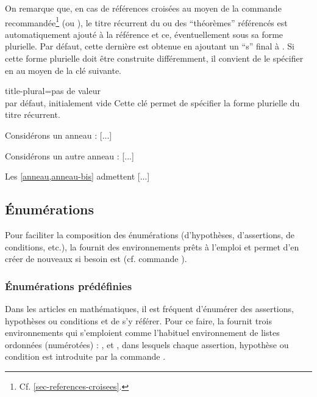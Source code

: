\documentclass[french,nolocaltoc]{nwejmart}
\newtheorem[style=definition]{fait}
\newtheorem[title=contraventionnalisation]{ctrv}
\newtheorem[title-plural=anneaux]{anneau}
\newtheorem[title-plural=idéaux]{idéal}
\begin{document}
  On remarque que, en cas de références croisées au moyen de la commande
  recommandée\footnote{Cf. \vref{sec-references-croisees}.}  (ou
  ), le titre récurrent du ou des \enquote{théorèmes} référencés
  est automatiquement ajouté à la référence et ce, éventuellement sous sa forme
  plurielle. Par défaut, cette dernière est obtenue en ajoutant un \enquote{s}
  final à . Si cette forme plurielle doit être construite
  différemment, il convient de le spécifier en  au moyen de la
  clé  suivante.
  \begin{docKey}{title-plural}{=}{pas de valeur\\par défaut, initialement vide}
      Cette clé permet de spécifier la forme plurielle du titre récurrent.
  \end{docKey}
\begin{bodycode}[listing and text,listing options={deletekeywords={[2]label}}]
\begin{anneau}\label{anneau}
  Considérons un anneau : [...]
\end{anneau}
\begin{anneau}\label{anneau-bis}
  Considérons un autre anneau : [...]
\end{anneau}
Les \vref{anneau,anneau-bis} admettent [...]
\end{bodycode}

\subsection{Énumérations}
\label{sec:list-dhyp-ou}

Pour faciliter la composition des énumérations (d'hypothèses, d'assertions, de
conditions, etc.), la \nwejmauthorcl{} fournit des environnements prêts
à l'emploi et permet d'en créer de nouveaux si besoin est (cf. commande
).

\subsubsection{Énumérations prédéfinies}
\label{sec:predefinies-:-listes}

Dans les articles en mathématiques, il est fréquent d'énumérer des assertions,
hypothèses ou conditions et de s'y référer. Pour ce faire, la \nwejmauthorcl{}
fournit trois environnements qui s'emploient comme l'habituel environnement
 de listes ordonnées (numérotées) :
,  et , dans lesquels
chaque assertion, hypothèse ou condition est introduite par la commande
.
\end{document}
